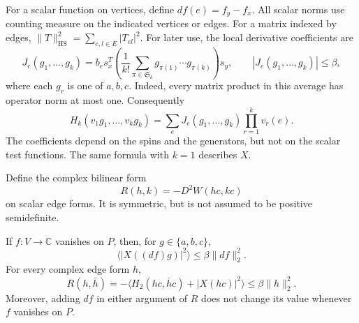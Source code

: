 For a scalar function on vertices, define \(df(e)=f_y-f_x\).
All scalar norms use counting measure on the indicated vertices or
edges. For a matrix indexed by edges,
\(\|T\|_{\mathrm{HS}}^2=\sum_{e,l\in E}|T_{el}|^2\).
For later use, the local derivative coefficients are
\begin{equation}
\label{eq:rotation-local-coefficients}
J_e(g_1,\ldots,g_k)
=b_e s_x^T\left(\frac{1}{k!}\sum_{\pi\in\mathfrak S_k}
g_{\pi(1)}\cdots g_{\pi(k)}\right)s_y,
\qquad |J_e(g_1,\ldots,g_k)|\le\beta,
\end{equation}
where each \(g_r\) is one of \(a,b,c\). Indeed, every matrix product
in this average has operator norm at most one. Consequently
\begin{equation}
\label{eq:rotation-local-expansion}
H_k(v_1g_1,\ldots,v_kg_k)
=\sum_e J_e(g_1,\ldots,g_k)\prod_{r=1}^k v_r(e).
\end{equation}
The coefficients depend on the spins and the generators, but not on the
scalar test functions. The same formula with \(k=1\) describes \(X\).

Define the complex bilinear form
\begin{equation}
\label{eq:rotation-R-definition}
R(h,k)=-D^2W(hc,kc)
\end{equation}
on scalar edge forms. It is symmetric, but is not assumed to be positive
semidefinite.

\begin{lemma}\label{lem:gradient}
If \(f:V\to\mathbb C\) vanishes on \(P\), then, for
\(g\in\{a,b,c\}\),
\begin{equation}
\label{eq:rotation-gradient-bound}
\bigl\langle |X((df)g)|^2\bigr\rangle
\le\beta\|df\|_2^2.
\end{equation}
For every complex edge form \(h\),
\begin{equation}
\label{eq:rotation-R-bound}
R(h,\bar h)
=-\bigl\langle H_2(hc,\bar h c)+|X(hc)|^2\bigr\rangle
\le\beta\|h\|_2^2.
\end{equation}
Moreover, adding \(df\) in either argument of \(R\) does not change
its value whenever \(f\) vanishes on \(P\).
\end{lemma}

